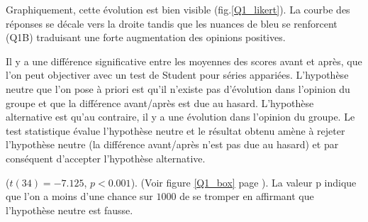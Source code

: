 \documentclass[12pt,english,french]{article}\usepackage{graphicx, color}
\begin{document}
Graphiquement, cette évolution est bien visible (fig.\ref{Q1_likert}). La courbe des réponses se décale vers la droite tandis que les nuances de bleu se renforcent (Q1B) traduisant une forte augmentation des opinions positives.

Il y a une différence significative entre les moyennes des scores avant et après, que l'on peut objectiver avec un test de Student pour séries appariées. L'hypothèse neutre que l'on pose à priori est qu'il n'existe pas d'évolution dans l'opinion du groupe et que la différence avant/après est due au hasard. L'hypothèse alternative est qu'au contraire, il y a une évolution dans l'opinion du groupe. Le test statistique évalue l'hypothèse neutre  et le résultat obtenu amène à rejeter l'hypothèse neutre (la différence avant/après n'est pas due au hasard) et par conséquent d'accepter l'hypothèse alternative.

($t(34)=-7.125$,
$p < 0.001$).
(Voir figure \ref{Q1_box} page \pageref{Q1_box}).
La valeur p indique que l'on a moins d'une chance sur $1000$ de se tromper en affirmant que l'hypothèse neutre est fausse.
\end{document}

